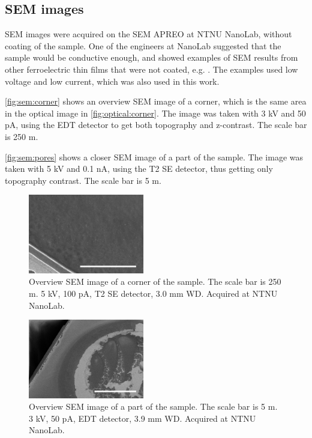\subsection{SEM images}
\label{results:SEM}

SEM images were acquired on the SEM APREO at NTNU NanoLab, without coating of the sample.
One of the engineers at NanoLab suggested that the sample would be conductive enough, and showed examples of SEM results from other ferroelectric thin films that were not coated, e.g. \cite{hunnestad_visualizing_2019}.
The examples used low voltage and low current, which was also used in this work.


\autoref{fig:sem:corner} shows an overview SEM image of a corner, which is the same area in the optical image in \autoref{fig:optical:corner}.
The image was taken with 3 kV and 50 pA, using the EDT detector to get both topography and z-contrast.
The scale bar is 250 \textmu m.


\autoref{fig:sem:pores} shows a closer SEM image of a part of the sample.
The image was taken with 5 kV and 0.1 nA, using the T2 SE detector, thus getting only topography contrast.
The scale bar is 5 \textmu m.


\begin{figure}[ht]
    \centering
    \includegraphics[width=0.45\textwidth]{figures/sem_high_res.jpg}
    \caption{Overview SEM image of a corner of the sample. 
    The scale bar is 250 \textmu m. 
    5 kV, 100 pA, T2 SE detector, 3.0 mm WD. 
    Acquired at NTNU NanoLab.
    }
    \label{fig:sem:corner}
\end{figure}

\begin{figure}[ht]
    \centering
    \includegraphics[width=0.45\textwidth]{figures/sem_overview.jpg}
    \caption{Overview SEM image of a part of the sample. 
    The scale bar is 5 \textmu m.
    3 kV, 50 pA, EDT detector, 3.9 mm WD. 
    Acquired at NTNU NanoLab.
    }
    \label{fig:sem:pores}
\end{figure}


